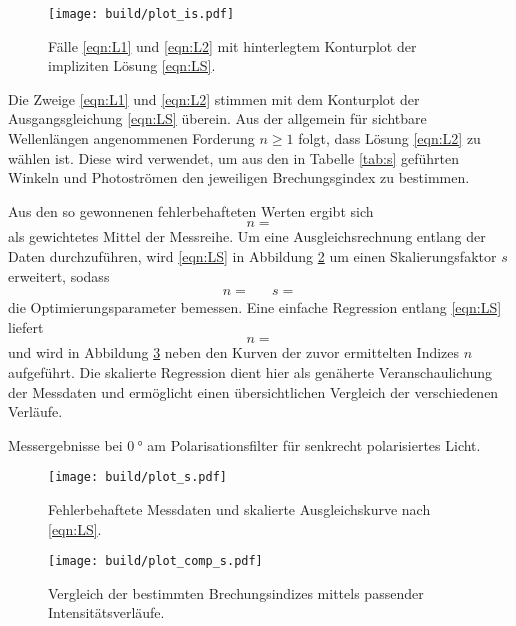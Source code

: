 \begin{figure}[H]
	\centering
	\texttt{[image: build/plot\_is.pdf]}
	\captionsetup{width=\linewidth}
	\caption{Fälle \eqref{eqn:L1} und \eqref{eqn:L2} mit hinterlegtem Konturplot der impliziten Lösung \eqref{eqn:LS}.}
	\label{fig:plot_is}
\end{figure}

Die Zweige \eqref{eqn:L1} und \eqref{eqn:L2} stimmen mit dem Konturplot der Ausgangsgleichung \eqref{eqn:LS} überein. Aus der allgemein für
sichtbare Wellenlängen angenommenen Forderung $n \geq 1$ folgt, dass Lösung \eqref{eqn:L2} zu wählen ist. Diese wird verwendet, um aus den
in Tabelle \ref{tab:s} geführten Winkeln und Photoströmen den jeweiligen Brechungsgindex zu bestimmen.

Aus den so gewonnenen fehlerbehafteten Werten ergibt sich
\begin{equation*}
	n = 
\end{equation*}
als gewichtetes Mittel der Messreihe. Um eine Ausgleichsrechnung entlang der Daten durchzuführen, wird \eqref{eqn:LS} in Abbildung \ref{fig:plot_s}
um einen Skalierungsfaktor $s$ erweitert, sodass
\begin{align*}
	n =  && s = 
\end{align*}
die Optimierungsparameter bemessen. Eine einfache Regression entlang \eqref{eqn:LS} liefert
\begin{equation*}
	n = 
\end{equation*}
und wird in Abbildung \ref{fig:plot_comp_s} neben den Kurven der zuvor ermittelten Indizes $n$ aufgeführt. Die skalierte Regression
dient hier als genäherte Veranschaulichung der Messdaten und ermöglicht einen übersichtlichen Vergleich der verschiedenen Verläufe.

\newpage\null\vfill
\begin{table}[H]
	\caption{Messergebnisse bei $\qty{0}{\degree}$ am Polarisationsfilter für senkrecht polarisiertes Licht.}
	\makebox[\textwidth]{
		\centering
		}
	\label{tab:s}
\end{table}
\vfill\null\newpage

\begin{figure}[H]
	\texttt{[image: build/plot\_s.pdf]}
	\caption{Fehlerbehaftete Messdaten und skalierte Ausgleichskurve nach \eqref{eqn:LS}.}
	\label{fig:plot_s}
\end{figure}

\begin{figure}[H]
	\texttt{[image: build/plot\_comp\_s.pdf]}
	\captionsetup{width=\linewidth}
	\caption{Vergleich der bestimmten Brechungsindizes mittels passender Intensitätsverläufe.}
	\label{fig:plot_comp_s}
\end{figure}

